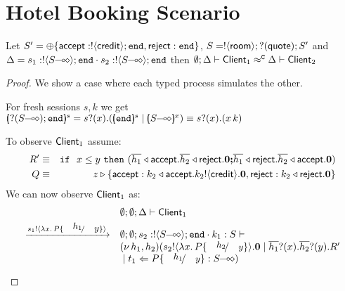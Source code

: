 \section{Hotel Booking Scenario}
\label{hotel_closure}

\begin{proposition}
	Let $S' = \oplus \{\mathsf{accept}: ! \langle \mathsf{credit} \rangle ; \mathtt{end}, \mathsf{reject}: \mathtt{end}\}$,
	$S = ! \langle \mathsf{room} \rangle ; ? (\mathsf{quote}) ; S'$
	and $\Delta = s_1: \btout{\lhot{S}} \tinact \cat s_2: \btout{\lhot{S}} \tinact$
	then
	$\emptyset; \Delta \vdash \mathsf{Client}_1 \approx^\mathtt{C} \Delta \vdash \mathsf{Client}_2$
\end{proposition}

\begin{proof}
	\noi We show a case where each typed process simulates the other.

	\noi For fresh sessions $s, k$ we get
	$
		\mapchar{\btinp{\lhot{S}} \tinact}{s} = \binp{s}{x} (\mapchar{\tinact}{s} \Par \mapchar{\lhot{S}}{x})
		\scong \binp{s}{x} (\appl{x}{k})
	$
	

	\noi To observe $\mathsf{Client}_1$ assume:
%
	\begin{eqnarray*}
		R' &\equiv& \mathtt{if}\ \ x \leq y\ \mathtt{then}\  (\overline{h_1} \triangleleft \mathsf{accept} . \overline{h_2} \triangleleft \mathsf{reject} . \mathbf{0}
		\boldsymbol{;} \overline{h_1} \triangleleft \mathsf{reject} . \overline{h_2} \triangleleft \mathsf{accept} . \mathbf{0})\\
		Q &\equiv& z \triangleright \{\mathsf{accept}: k_2 \triangleleft \mathsf{accept} . k_2 ! \langle \mathsf{credit} \rangle . \mathbf{0}, \mathsf{reject}: k_2 \triangleleft \mathsf{reject} . \mathbf{0}\}
	\end{eqnarray*}
%
	\noi We can now observe $\mathsf{Client}_1$ as:
\[
	\begin{array}{ll}
		& \es; \es; \Delta \proves \Client_1
		\\[1mm]

		\by{\bactout{s_1}{\abs{x}{P \subst{h_1}{y}}}}&
		\es; \es; s_2: \btout{\lhot{S}} \tinact \cat k_1: S \proves \\
		& \newsp{h_1, h_2}{\bout{s_2}{\abs{x}{P \subst{h_2}{y}}} \inact
		\Par \binp{\dual{h_1}}{x} \binp{\dual{h_2}}{y} R'\\
		& \Par \ftrigger{t_1}{P \subst{h_1}{y}}{\lhot{S}}}
		\\[1mm]


\end{array}\]
\end{proof}
